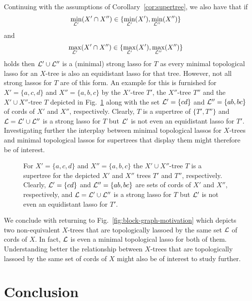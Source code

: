 Continuing with the assumptions of Corollary~\ref{cor:supertree}, we also have
that if
\begin{equation*}
  \min_{{\mathcal L}'}(X'\cap X'')\in \{\min_{{\mathcal L}'}(X'), \min_{{\mathcal L}''}(X'')\}
\end{equation*}
and
\begin{equation*}
  \max_{{\mathcal L}'}(X'\cap X'')\in \{\max_{{\mathcal L}'}(X'), \max_{{\mathcal L}''}(X'')\}
\end{equation*}
holds then ${\mathcal L}'\cup {\mathcal L}''$ is a (minimal) strong lasso for $T$ as every
minimal topological lasso for an $X$-tree is also an equidistant lasso for
that tree. However, not all strong lassos for $T$ are of this form. An example
for this is furnished for $X'=\{a,c,d\}$ and $X''=\{a,b,c\}$ by the $X'$-tree
$T'$, the $X''$-tree $T''$ and the $X'\cup X''$-tree $T$ depicted in
Fig.~\ref{fig:supertree} along with the set ${\mathcal L}'=\{cd\}$ and
${\mathcal L}''=\{ab,bc\}$ of cords of $X'$ and $X''$, respectively. Clearly, $T$ is a
supertree of $\{T',T''\}$ and ${\mathcal L}={\mathcal L}'\cup{\mathcal L}''$ is a strong lasso for $T$
but ${\mathcal L}'$ is not even an equidistant lasso for $T'$. Investigating further
the interplay between minimal topological lassos for $X$-trees and minimal
topological lassos for supertrees that display them might therefore be of
interest.

\begin{figure}[h]
  \begin{center}
    
  \end{center}
  \caption{ For $X'=\{a,c,d\}$ and $X''=\{a,b,c\}$ the $X'\cup X''$-tree $T$
    is a supertree for the depicted $X'$ and $X''$ trees $T'$ and $T''$,
    respectively. Clearly, ${\mathcal L}'=\{cd\}$ and ${\mathcal L}''=\{ab,bc\}$ are sets of
    cords of $X'$ and $X''$, respectively, and ${\mathcal L}={\mathcal L}'\cup{\mathcal L}''$ is a strong
    lasso for $T$ but ${\mathcal L}'$ is not even an equidistant lasso for $T'$.  }
  \label{fig:supertree}
\end{figure}

We conclude with returning to Fig.~\ref{fig:block-graph-motivation} which
depicts two non-equivalent $X$-trees that are topologically lassoed by the
same set ${\mathcal L}$ of cords of $X$. In fact, ${\mathcal L}$ is even a minimal topological
lasso for both of them.  Understanding better the relationship between
$X$-trees that are topologically lassoed by the same set of cords of $X$ might
also be of interest to study further.

\section{Conclusion}
\label{sec:conclusion-dist}


